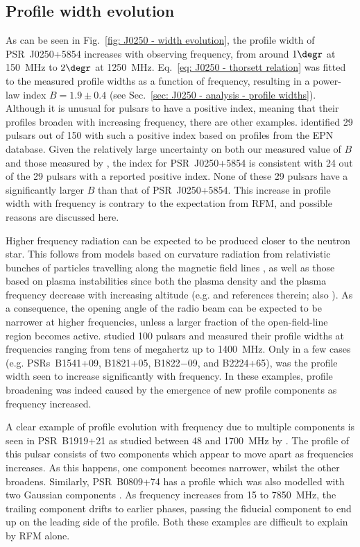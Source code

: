 \subsection{Profile width evolution}
\label{sec: J0250 - discussion - profile width} 
As can be seen in Fig.~\ref{fig: J0250 - width evolution}, the profile width of PSR~J0250+5854 increases with observing frequency, from around $1\degr$ at 150~MHz to $2\degr$ at 1250~MHz. Eq.~\eqref{eq: J0250 - thorsett relation} was fitted to the measured profile widths as a function of frequency, resulting in a power-law index $B = 1.9\pm0.4$ (see Sec.~\ref{sec: J0250 - analysis - profile widths}). Although it is unusual for pulsars to have a positive index, meaning that their profiles broaden with increasing frequency, there are other examples. \citet{CWxx2014} identified 29 pulsars out of 150 with such a positive index based on profiles from the EPN database. Given the relatively large uncertainty on both our measured value of $B$ and those measured by \citet{CWxx2014}, the index for PSR~J0250+5854 is consistent with 24 out of the 29 pulsars with a reported positive index. None of these 29 pulsars have a significantly larger $B$ than that of PSR~J0250+5854. This increase in profile width with frequency is contrary to the expectation from RFM, and possible reasons are discussed here.

Higher frequency radiation can be expected to be produced closer to the neutron star. This follows from models based on curvature radiation from relativistic bunches of particles travelling along the magnetic field lines \citep[e.g.][ and references therein]{GLMx2004,DRxx2015}, as well as those based on plasma instabilities since both the plasma density and the plasma frequency decrease with increasing altitude (e.g. \citealt{HAxx2001} and references therein; also \citealt{GGMx2002}). As a consequence, the opening angle of the radio beam can be expected to be narrower at higher frequencies, unless a larger fraction of the open-field-line region becomes active. \citet{PHS+2016} studied 100 pulsars and measured their profile widths at frequencies ranging from tens of megahertz up to 1400~MHz. Only in a few cases (e.g. PSRs~B1541+09, B1821+05, B1822$-$09, and B2224+65), was the profile width seen to increase significantly with frequency. In these examples, profile broadening was indeed caused by the emergence of new profile components as frequency increased.

A clear example of profile evolution with frequency due to multiple components is seen in PSR~B1919+21 as studied between 48 and 1700~MHz by \citet{HSH+2012}. The profile of this pulsar consists of two components which appear to move apart as frequencies increases. As this happens, one component becomes narrower, whilst the other broadens. Similarly, PSR~B0809+74 has a profile which was also modelled with two Gaussian components \citep{HSH+2012}. As frequency increases from 15 to 7850~MHz, the trailing component drifts to earlier phases, passing the fiducial component to end up on the leading side of the profile. Both these examples are difficult to explain by RFM alone.

